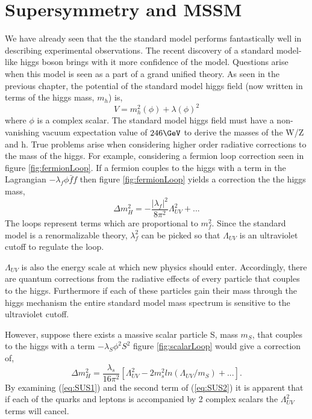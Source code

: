 \chapter{Supersymmetry and MSSM}

We have already seen that the the standard model 
performs fantastically well in describing experimental observations. The
recent discovery of a standard model-like higgs boson brings with it
more confidence of the model. Questions arise when this model is seen as 
a part of a grand unified theory.
As seen in the previous chapter, the potential of the standard model higgs 
field (now written in terms of the higgs mass, $m_{h}$) is,
\begin{equation}
V=m_{h}^{2}(\phi)+\lambda(\phi)^{2}
\end{equation}
where $\phi$ is a complex scalar.
The standard model higgs field must have a non-vanishing vacuum expectation 
value of $246 \GeV$ to derive the masses of the W/Z and h.
True problems arise when
considering higher order radiative corrections to the mass of the higgs. For example, 
considering a fermion loop correction seen in figure \ref{fig:fermionLoop}. 
If a fermion couples to the higgs with a term in the Lagrangian $-\lambda_{f}\phi \bar{f}f$
then figure \ref{fig:fermionLoop} 
yields a correction the the higgs mass,
\begin{equation}
\Delta m_{H}^{2}=-\frac{|\lambda_{f}|^{2}}{8\pi^{2}}\Lambda_{UV}^{2}+...
\label{eq:SUS1}
\end{equation}
The loops represent terms which are proportional to $m_{f}^{2}$.
Since the standard model is a renormalizable theory, $\lambda_{f}^{2}$ can
be picked so that $\Lambda_{UV}$ is an ultraviolet cutoff to regulate the loop. 

$\Lambda_{UV}$ is also the energy scale at which new physics should enter.
Accordingly, there are quantum corrections from the radiative
effects of every particle that couples to the higgs. Furthermore if each of these 
particles gain their mass through the higgs mechanism the entire standard model 
mass spectrum is sensitive to the ultraviolet cutoff.

However, suppose there exists a massive scalar particle S, mass $m_{S}$, that couples
to the higgs with a term $-\lambda_{S}\phi^{2} S^{2}$
figure \ref{fig:scalarLoop} would give a correction of,
\begin{equation}
\Delta m_{H}^{2}=\frac{\lambda_{s}}{16\pi^{2}}\left[\Lambda_{UV}^{2}-2m_{s}^{2}ln(\Lambda_{UV}/m_{S})+... \right].
\label{eq:SUS2}
\end{equation}
By examining (\ref{eq:SUS1}) and the second term of (\ref{eq:SUS2}) it is apparent that if each of the quarks
and leptons is accompanied by 2 complex scalars the $\Lambda_{UV}^{2}$ terms will cancel.

